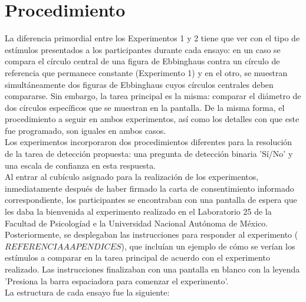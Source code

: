 \section{Procedimiento}

La diferencia primordial entre los Experimentos 1 y 2 tiene que ver con el tipo de estímulos presentados a los participantes durante cada ensayo: en un caso se compara el círculo central de una figura de Ebbinghaus contra un círculo de referencia que permanece constante (Experimento 1) y en el otro, se muestran simultáneamente dos figuras de Ebbinghaus cuyos círculos centrales deben compararse. Sin embargo, la tarea principal es la misma: comparar el diámetro de dos círculos específicos que se muestran en la pantalla. De la misma forma, el procedimiento a seguir en ambos experimentos, así como los detalles con que este fue programado, son iguales en ambos casos.\\

Los experimentos incorporaron dos procedimientos diferentes para la resolución de la tarea de detección propuesta: una pregunta de detección binaria 'Sí/No' y una escala de confianza en esta respuesta.\\

Al entrar al cubículo asignado para la realización de los experimentos, inmediatamente después de haber firmado la carta de consentimiento informado correspondiente, los participantes se encontraban con una pantalla de espera que les daba la bienvenida al experimento realizado en el Laboratorio 25 de la Facultad de Psicologíad e la Universidad Nacional Autónoma de México. Posteriormente, se desplegaban las instrucciones para responder al experimento ($REFERENCIA A APENDICES$), que incluían un ejemplo de cómo se verían los estímulos a comparar en la tarea principal de acuerdo con el experimento realizado. Las instrucciones finalizaban con una pantalla en blanco con la leyenda 'Presiona la barra espaciadora para comenzar el experimento'.\\

La estructura de cada ensayo fue la siguiente:\\

